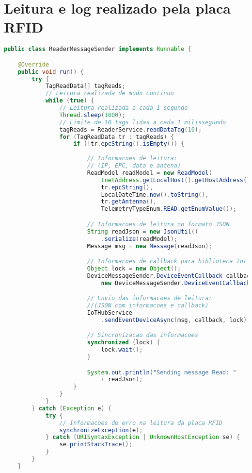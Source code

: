 \section{Leitura e log realizado pela placa RFID}

\begin{lstlisting}[language={Java}, label=leitura-log-placa]
public class ReaderMessageSender implements Runnable {

    @Override
    public void run() {
        try {
            TagReadData[] tagReads;
            // Leitura realizada de modo continuo
            while (true) {
                // Leitura realizada a cada 1 segundo
                Thread.sleep(1000);
                // Limite de 10 tags lidas a cada 1 milissegundo
                tagReads = ReaderService.readDataTag(10);
                for (TagReadData tr : tagReads) {
                    if (!tr.epcString().isEmpty()) {
                    
                        // Informacoes de leitura:
                        // (IP, EPC, data e antena)
                        ReadModel readModel = new ReadModel(
                            InetAddress.getLocalHost().getHostAddress(),
                            tr.epcString(),
                            LocalDateTime.now().toString(),
                            tr.getAntenna(),
                            TelemetryTypeEnum.READ.getEnumValue());

                        // Informacoes de leitura no formato JSON
                        String readJson = new JsonUtil()
                            .serialize(readModel);
                        Message msg = new Message(readJson);

                        // Informacoes de callback para biblioteca Iot Hub
                        Object lock = new Object();
                        DeviceMessageSender.DeviceEventCallback callback =
                            new DeviceMessageSender.DeviceEventCallback();

                        // Envio das informacoes de leitura:
                        //(JSON com informacoes e callback)
                        IoTHubService
                            .sendEventDeviceAsync(msg, callback, lock);

                        // Sincronizacao das informacoes
                        synchronized (lock) {
                            lock.wait();
                        }

                        System.out.println("Sending message Read: "
                            + readJson);
                    }
                }
            }
        } catch (Exception e) {
            try {
                // Informacoes de erro na leitura da placa RFID
                synchronizeException(e);
            } catch (URISyntaxException | UnknownHostException se) {
                se.printStackTrace();
            }
        }
    }



\end{lstlisting}

